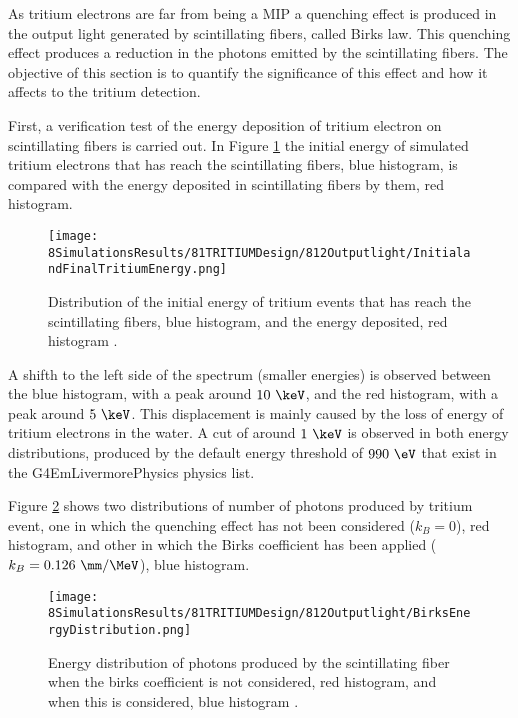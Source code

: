 As tritium electrons are far from being a MIP a quenching effect is produced in the output light generated by scintillating fibers, called Birks law. This quenching effect produces a reduction in the photons emitted by the scintillating fibers. The objective of this section is to quantify the significance of this effect and how it affects to the tritium detection.

First, a verification test of the energy deposition of tritium electron on scintillating fibers is carried out. In Figure \ref{fig:InitialFinalTritiumEnergy} the initial energy of simulated tritium electrons that has reach the scintillating fibers, blue histogram, is compared with the energy deposited in scintillating fibers by them, red histogram.

\begin{figure}[h]
\centering
\texttt{[image: 8SimulationsResults/81TRITIUMDesign/812Outputlight/InitialandFinalTritiumEnergy.png]}
\caption{Distribution of the initial energy of tritium events that has reach the scintillating fibers, blue histogram, and the energy deposited, red histogram \cite{SimulationPaperCarlos}.\label{fig:InitialFinalTritiumEnergy}}
\end{figure}

A shifth to the left side of the spectrum (smaller energies) is observed between the blue histogram, with a peak around $10~\keV$, and the red histogram, with a peak around $5~\keV$. This displacement is mainly caused by the loss of energy of tritium electrons in the water. A cut of around $1~\keV$ is observed in both energy distributions, produced by the default energy threshold of $990~\eV$ that exist in the G4EmLivermorePhysics physics list.

Figure \ref{fig:BirksEffectinEnergyDistribution} shows two distributions of number of photons produced by tritium event, one in which the quenching effect has not been considered ($k_B=0$), red histogram, and other in which the Birks coefficient has been applied ($k_B=0.126~\mm/\MeV$), blue histogram.

\begin{figure}[h]
\centering
\texttt{[image: 8SimulationsResults/81TRITIUMDesign/812Outputlight/BirksEnergyDistribution.png]}
\caption{Energy distribution of photons produced by the scintillating fiber when the birks coefficient is not considered, red histogram, and when this is considered, blue histogram \cite{SimulationPaperCarlos}.\label{fig:BirksEffectinEnergyDistribution}}
\end{figure}  


